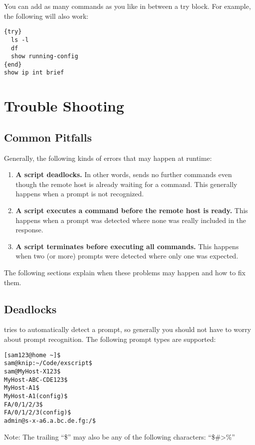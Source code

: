 You can add as many commands as you like in between a try block. For 
example, the following will also work: 

\begin{lstlisting}
{try}
  ls -l
  df
  show running-config
{end}
show ip int brief
\end{lstlisting}


\section{Trouble Shooting}
\subsection{Common Pitfalls}

Generally, the following kinds of errors that may happen at runtime:

\begin{enumerate}
\item {\bf A script deadlocks.} In other words, \product sends no further 
commands even though the remote host is already waiting for a command. 
This generally happens when a prompt is not recognized. 
\item {\bf A script executes a command before the remote host is ready.} 
This happens when a prompt was detected where none was really included 
in the response. 
\item {\bf A script terminates before executing all commands.} This 
happens when two (or more) prompts were detected where only one was 
expected. 
\end{enumerate}

The following sections explain when these problems may happen and how to fix them. 

\subsection{Deadlocks}

\product tries to automatically detect a prompt, so generally you should 
not have to worry about prompt recognition. The following prompt types 
are supported: 

\begin{lstlisting}
[sam123@home ~]$
sam@knip:~/Code/exscript$
sam@MyHost-X123$
MyHost-ABC-CDE123$
MyHost-A1$
MyHost-A1(config)$
FA/0/1/2/3$
FA/0/1/2/3(config)$
admin@s-x-a6.a.bc.de.fg:/$
\end{lstlisting}

Note: The trailing ``\$'' may also be any of the following characters: ``\$\#>\%''

